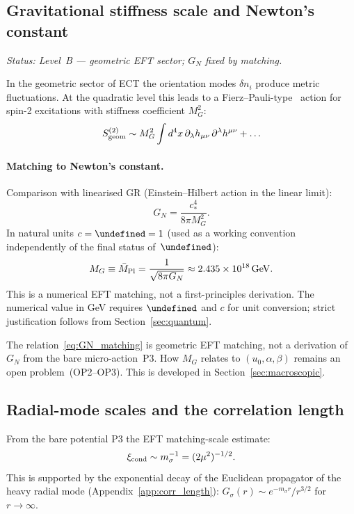 \documentclass[11pt,a4paper]{article}
\let\hbar\undefined
\numberwithin{equation}{section}
\begin{document}
\subsection{Gravitational stiffness scale and Newton's constant}
\label{sec:GN_matching}

\textit{Status: Level~B --- geometric EFT sector; $G_N$ fixed by matching.}

In the geometric sector of ECT the orientation modes $\delta n_i$
produce metric fluctuations. At the quadratic level this leads to
a Fierz--Pauli-type~\cite{Fierz1939} action for spin-2 excitations
with stiffness coefficient $M_G^2$:
\begin{equation}
  S_{\rm geom}^{(2)}\sim M_G^2\int d^4x\,\partial_\lambda h_{\mu\nu}\,\partial^\lambda h^{\mu\nu}+\ldots
\end{equation}

\paragraph{Matching to Newton's constant.}
Comparison with linearised GR (Einstein--Hilbert action in the linear limit):
\begin{equation}
  \label{eq:GN_matching}
  G_N = \frac{c_*^4}{8\pi M_G^2}.
\end{equation}
In natural units $c=\hbar=1$ (used as a working convention
independently of the final status of~$\hbar$):
\begin{equation}
  M_G \equiv \bar{M}_{\rm Pl} = \frac{1}{\sqrt{8\pi G_N}}
  \approx 2.435\times 10^{18}\,{\rm GeV}.
\end{equation}
This is a numerical EFT matching, not a first-principles derivation.
The numerical value in GeV requires $\hbar$ and $c$ for unit conversion;
strict justification follows from Section~\ref{sec:quantum}.

The relation~\eqref{eq:GN_matching} is geometric EFT matching,
not a derivation of $G_N$ from the bare micro-action~P3.
How $M_G$ relates to $(u_0,\alpha,\beta)$ remains an open
problem~(OP2--OP3). This is developed in Section~\ref{sec:macroscopic}.

\subsection{Radial-mode scales and the correlation length}
\label{sec:sigma_scales}

From the bare potential P3 the EFT matching-scale estimate:
\begin{equation}
  \xi_{\rm cond}\sim m_\sigma^{-1} = (2\mu^2)^{-1/2}.
\end{equation}
This is supported by the exponential decay of the Euclidean propagator
of the heavy radial mode (Appendix~\ref{app:corr_length}):
$G_\sigma(r)\sim e^{-m_\sigma r}/r^{3/2}$ for $r\to\infty$.
\end{document}
